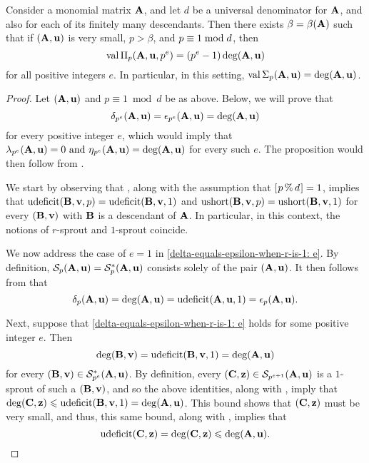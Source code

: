 \documentclass{article}
\begin{document}
\begin{proposition}
	\label{important-special: P}
   Consider a monomial matrix $\mathbf{A}$, and let $d$ be a universal denominator for $\mathbf{A}$, and also for each of its finitely many descendants.  Then there exists $\beta = \beta(\mathbf{A})$ such that if $(\mathbf{A}, \mathbf{u})$ is very small, $p>\beta$, and $p \equiv 1 \bmod d$, then
\[
 \operatorname{val}\Pi_p(\mathbf{A},\mathbf{u},p^e) = (p^e-1) \operatorname{deg}(\mathbf{A},\mathbf{u})
\]
for all positive integers  $e$.  In particular, in this setting,
$\operatorname{val} \Sigma_p (\mathbf{A},\mathbf{u}) = \operatorname{deg}(\mathbf{A},\mathbf{u})$.
	\end{proposition}

\begin{proof}  Let $(\mathbf{A}, \mathbf{u})$ and $p \equiv 1 \bmod d$ be as above.  Below, we will prove that 
\begin{equation}
\label{delta-equals-epsilon-when-r-is-1: e}
\delta_{p^e}(\mathbf{A}, \mathbf{u}) = \epsilon_{p^e}(\mathbf{A}, \mathbf{u}) = \deg(\mathbf{A}, \mathbf{u})
\end{equation}
for every positive integer $e$, which would imply that $\lambda_{p^e}(\mathbf{A}, \mathbf{u}) = 0 \text{ and } \eta_{p^e}(\mathbf{A}, \mathbf{u}) = \deg(\mathbf{A}, \mathbf{u})$ for every such $e$.  The proposition would then follow from . 

We start by observing that , along with the assumption that $[ \hspace{.01in} p \, \% \, d \hspace{.01in} ] = 1$,  implies that $\operatorname{udeficit}(\mathbf{B}, \mathbf{v}, p) = \operatorname{udeficit}(\mathbf{B}, \mathbf{v}, 1)$ and $\operatorname{ushort}(\mathbf{B}, \mathbf{v}, p) = \operatorname{ushort}(\mathbf{B}, \mathbf{v}, 1)$ for every $(\mathbf{B}, \mathbf{v})$ with $\mathbf{B}$ is a descendant of $\mathbf{A}$.  In particular, in this context, the notions of $r$-sprout and $1$-sprout coincide. 

We now address the case of $e=1$ in \eqref{delta-equals-epsilon-when-r-is-1: e}.  By definition, $\mathcal{S}_p(\mathbf{A}, \mathbf{u}) = \mathcal{S}_p^{\ast}(\mathbf{A}, \mathbf{u})$ consists solely of the pair $(\mathbf{A}, \mathbf{u})$.  It then follows from  that
\[ \delta_p(\mathbf{A}, \mathbf{u}) = \deg(\mathbf{A}, \mathbf{u}) = \operatorname{udeficit}(\mathbf{A}, \mathbf{u}, 1) = \epsilon_p(\mathbf{A}, \mathbf{u}).\] 

Next, suppose that \eqref{delta-equals-epsilon-when-r-is-1: e} holds for some positive integer $e$.  Then
\[ \deg(\mathbf{B}, \mathbf{v}) = \operatorname{udeficit}(\mathbf{B}, \mathbf{v}, 1) = \deg(\mathbf{A}, \mathbf{u}) \] 
 for every $(\mathbf{B}, \mathbf{v}) \in \mathcal{S}_{p^e}^{\ast}(\mathbf{A}, \mathbf{u})$.  By definition, every $(\mathbf{C}, \mathbf{z}) \in \mathcal{S}_{p^{e+1}}(\mathbf{A}, \mathbf{u})$ is a $1$-sprout of such a $(\mathbf{B}, \mathbf{v})$, and so the above identities, along with , imply that
$\deg(\mathbf{C}, \mathbf{z}) \leqslant \operatorname{udeficit}(\mathbf{B}, \mathbf{v}, 1) = \deg(\mathbf{A}, \mathbf{u})$.  This bound shows that $(\mathbf{C}, \mathbf{z})$ must be very small, and thus, this same bound, along with , implies that
\begin{equation}
\label{describing-next-level-of-graph-p-congruent-to-1: e}
 \operatorname{udeficit}(\mathbf{C}, \mathbf{z}) = \deg(\mathbf{C}, \mathbf{z}) \leqslant \deg(\mathbf{A}, \mathbf{u}).
\end{equation}


\end{proof}
\end{document}
